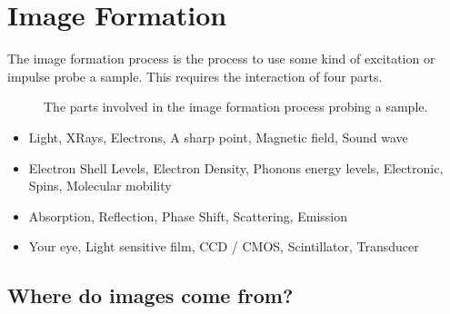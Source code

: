 \documentclass[letterpaper,10pt,english]{sphinxmanual}
\begin{document}
\section{Image Formation}
\label{\detokenize{01-Introduction:image-formation}}
\sphinxAtStartPar
The image formation process is the process to use some kind of excitation or impulse probe a sample. This requires the interaction of four parts.

\begin{figure}[htbp]
\centering
\capstart

\noindent{}
\caption{The parts involved in the image formation process probing a sample.}\label{\detokenize{01-Introduction:id17}}\end{figure}


\begin{itemize}
\item {} 
\sphinxAtStartPar
{} Light, X\sphinxhyphen{}Rays, Electrons, A sharp point, Magnetic field, Sound wave

\item {} 
\sphinxAtStartPar
{} Electron Shell Levels, Electron Density, Phonons energy levels, Electronic, Spins, Molecular mobility

\item {} 
\sphinxAtStartPar
{} Absorption, Reflection, Phase Shift, Scattering, Emission

\item {} 
\sphinxAtStartPar
{} Your eye, Light sensitive film, CCD / CMOS, Scintillator, Transducer

\end{itemize}


\subsection{Where do images come from?}
\label{\detokenize{01-Introduction:where-do-images-come-from}}
\end{document}
